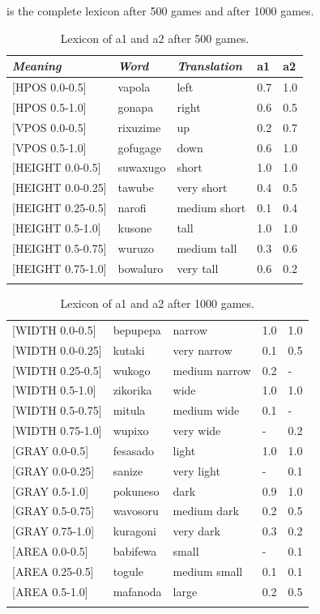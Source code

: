  is the complete lexicon after 500 games and  after 1000 games. 
\begin{table}
\begin{center}
\begin{tabular}{ l  l  l  l  l }
\lsptoprule
{\itshape Meaning}&{\itshape Word}&{\itshape Translation} & {\bfshape  a1}&{\bfshape  a2} \\ \midrule
{}[HPOS 0.0-0.5]&vapola&left &0.7&1.0\\ 
{}[HPOS 0.5-1.0]&gonapa&right &0.6&0.5\\ 
{}[VPOS 0.0-0.5]&rixuzime& up & 0.2&0.7\\ 
{}[VPOS 0.5-1.0]&gofugage& down &0.6&1.0\\ 
{}[HEIGHT 0.0-0.5]&suwaxugo&short & 1.0&1.0\\ 
{}[HEIGHT 0.0-0.25]&tawube&very short & 0.4&0.5\\ 
{}[HEIGHT 0.25-0.5]&narofi&medium short&0.1&0.4\\ 
{}[HEIGHT 0.5-1.0]&kusone&tall&1.0&1.0\\ 
{}[HEIGHT 0.5-0.75]&wuruzo&medium tall&0.3&0.6\\ 
{}[HEIGHT 0.75-1.0]&bowaluro&very tall&0.6&0.2\\ 
\lspbottomrule
\end{tabular}
\caption{\label{tab:lex500a} Lexicon of {\bfshape  a1} and {\bfshape  a2} after 500 games.}
\end{center}
\end{table}

\begin{table}
\begin{center}
\begin{tabular}{ l  l  l  l  l }
\lsptoprule
{}[WIDTH 0.0-0.5]&bepupepa&narrow & 1.0&1.0\\ 
{}[WIDTH 0.0-0.25]&kutaki&very narrow & 0.1&0.5\\ 
{}[WIDTH 0.25-0.5]&wukogo&medium narrow & 0.2&-\\ 
{}[WIDTH 0.5-1.0]&zikorika&wide & 1.0&1.0\\ 
{}[WIDTH 0.5-0.75]&mitula&medium wide &0.1&-\\ 
{}[WIDTH 0.75-1.0]&wupixo&very wide & -&0.2\\ 
{}[GRAY 0.0-0.5]&fesasado&light & 1.0&1.0\\ 
{}[GRAY 0.0-0.25]&sanize&very light & -&0.1\\ 
{}[GRAY 0.5-1.0]&pokuneso&dark &0.9&1.0\\ 
{}[GRAY 0.5-0.75]&wavosoru&medium dark & 0.2&0.5\\ 
{}[GRAY 0.75-1.0]&kuragoni&very dark &0.3&0.2\\ 
{}[AREA 0.0-0.5]&babifewa&small & -&0.1\\ 
{}[AREA 0.25-0.5]&togule&medium small & 0.1&0.1\\ 
{}[AREA 0.5-1.0]&mafanoda&large & 0.2&0.5\\ 
\lspbottomrule
\end{tabular}
\caption{\label{tab:lex500b} Lexicon of {\bfshape  a1} and {\bfshape  a2} after 1000 games.}
\end{center}
\end{table}

